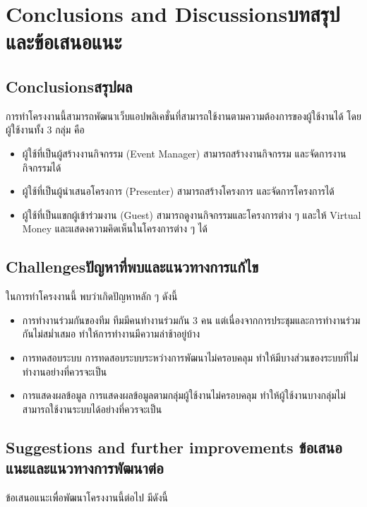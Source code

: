 \chapter{\ifenglish Conclusions and Discussions\else บทสรุปและข้อเสนอแนะ\fi}

\section{\ifenglish Conclusions\else สรุปผล\fi}
การทําโครงงานนี้สามารถพัฒนาเว็บแอปพลิเคชั่นที่สามารถใช้งานตามความต้องการของผู้ใช้งานได้
โดยผู้ใช้งานทั้ง 3 กลุ่ม คือ
\begin{itemize}
      \item ผู้ใช้ที่เป็นผู้สร้างงานกิจกรรม (Event Manager)
            สามารถสร้างงานกิจกรรม และจัดการงานกิจกรรมได้
      \item ผู้ใช้ที่เป็นผู้นำเสนอโครงการ (Presenter)
            สามารถสร้างโครงการ และจัดการโครงการได้
      \item ผู้ใช้ที่เป็นแขกผู้เข้าร่วมงาน (Guest)
            สามารถดูงานกิจกรรมและโครงการต่าง ๆ และให้ Virtual Money และแสดงความคิดเห็นในโครงการต่าง ๆ ได้
\end{itemize}
\section{\ifenglish Challenges\else ปัญหาที่พบและแนวทางการแก้ไข\fi}
ในการทำโครงงานนี้ พบว่าเกิดปัญหาหลัก ๆ ดังนี้

\begin{itemize}
      \item การทำงานร่วมกันของทีม
            ทีมมีคนทำงานร่วมกัน 3 คน แต่เนื่องจากการประชุมและการทำงานร่วมกันไม่สม่ำเสมอ ทำให้การทำงานมีความล่าช้าอยู่บ้าง
      \item การทดสอบระบบ
            การทดสอบระบบระหว่างการพัฒนาไม่ครอบคลุม ทำให้มีบางส่วนของระบบที่ไม่ทำงานอย่างที่ควรจะเป็น
      \item การแสดงผลข้อมูล
            การแสดงผลข้อมูลตามกลุ่มผู้ใช้งานไม่ครอบคลุม ทำให้ผู้ใช้งานบางกลุ่มไม่สามารถใช้งานระบบได้อย่างที่ควรจะเป็น
\end{itemize}

\section{\ifenglish%
        Suggestions and further improvements
  \else%
        ข้อเสนอแนะและแนวทางการพัฒนาต่อ
  \fi
 }

ข้อเสนอแนะเพื่อพัฒนาโครงงานนี้ต่อไป มีดังนี้


